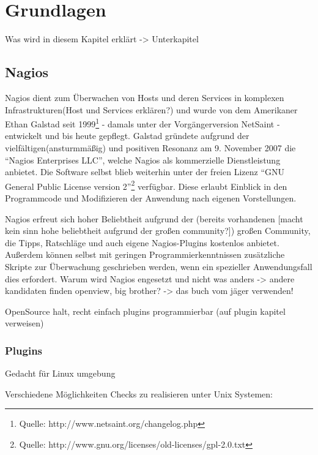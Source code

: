 \section{Grundlagen}
Was wird in diesem Kapitel erklärt -> Unterkapitel

\subsection{Nagios}
Nagios dient zum Überwachen von Hosts und deren Services in komplexen Infrastrukturen(Host und Services erklären?) und wurde von dem Amerikaner Ethan Galstad seit 1999\footnote{Quelle: http://www.netsaint.org/changelog.php} - damals unter der Vorgängerversion NetSaint - entwickelt und bis heute gepflegt.
Galstad gründete aufgrund der vielfältigen(ansturmmäßig) und positiven Resonanz am 9. November 2007 die "`Nagios Enterprises LLC"', welche Nagios als kommerzielle Dienstleistung anbietet.
Die Software selbst blieb weiterhin unter der freien Lizenz "`GNU General Public License version 2"'\footnote{Quelle: http://www.gnu.org/licenses/old-licenses/gpl-2.0.txt} verfügbar.
Diese erlaubt Einblick in den Programmcode und Modifizieren der Anwendung nach eigenen Vorstellungen.

Nagios erfreut sich hoher Beliebtheit aufgrund der (bereits vorhandenen [macht kein sinn hohe beliebtheit aufgrund der großen community?]) großen Community, die Tipps, Ratschläge und auch eigene Nagios-Plugins kostenlos anbietet.
Außerdem können selbst mit geringen Programmierkenntnissen zusätzliche Skripte zur Überwachung geschrieben werden, wenn ein spezieller Anwendungsfall dies erfordert.
Warum wird Nagios engesetzt und nicht was anders -> andere kandidaten finden openview, big brother? -> das buch vom jäger verwenden!

OpenSource halt, recht einfach plugins programmierbar (auf plugin kapitel verweisen)





\subsubsection{Plugins}
Gedacht für Linux umgebung

Verschiedene Möglichkeiten Checks zu realisieren unter Unix Systemen:

